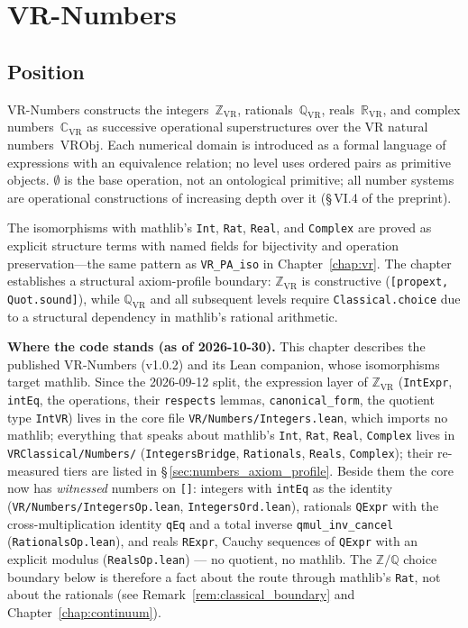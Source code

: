 \chapter{VR-Numbers}
\label{chap:numbers}

\section{Position}

VR-Numbers constructs the integers~$\mathbb{Z}_{\mathrm{VR}}$, rationals~$\mathbb{Q}_{\mathrm{VR}}$,
reals~$\mathbb{R}_{\mathrm{VR}}$, and complex numbers~$\mathbb{C}_{\mathrm{VR}}$ as successive
operational superstructures over the VR natural numbers~$\mathrm{VRObj}$.
Each numerical domain is introduced as a formal language of expressions with an equivalence
relation; no level uses ordered pairs as primitive objects.
$\emptyset$ is the base operation, not an ontological primitive; all number systems are
operational constructions of increasing depth over it (§\,VI.4 of the preprint).

The isomorphisms with mathlib's \texttt{Int}, \texttt{Rat}, \texttt{Real}, and
\texttt{Complex} are proved as explicit structure terms with named fields for
bijectivity and operation preservation---the same pattern as \texttt{VR\_PA\_iso}
in Chapter~\ref{chap:vr}.  The chapter establishes a structural axiom-profile
boundary: $\mathbb{Z}_{\mathrm{VR}}$ is constructive (\texttt{[propext, Quot.sound]}),
while $\mathbb{Q}_{\mathrm{VR}}$ and all subsequent levels require
\texttt{Classical.choice} due to a structural dependency in mathlib's rational
arithmetic.

\textbf{Where the code stands (as of 2026-10-30).}  This chapter describes the
published VR-Numbers (v1.0.2) and its Lean companion, whose isomorphisms target
mathlib.  Since the 2026-09-12 split, the expression layer of $\mathbb{Z}_{\mathrm{VR}}$
(\texttt{IntExpr}, \texttt{intEq}, the operations, their \texttt{respects} lemmas,
\texttt{canonical\_form}, the quotient type \texttt{IntVR}) lives in the core file
\texttt{VR/Numbers/Integers.lean}, which imports no mathlib; everything that speaks about
mathlib's \texttt{Int}, \texttt{Rat}, \texttt{Real}, \texttt{Complex} lives in
\texttt{VRClassical/Numbers/} (\texttt{IntegersBridge}, \texttt{Rationals},
\texttt{Reals}, \texttt{Complex}); their re-measured tiers are listed in
\S\,\ref{sec:numbers_axiom_profile}.  Beside
them the core now has \emph{witnessed} numbers on \texttt{[]}: integers with
\texttt{intEq} as the identity (\texttt{VR/Numbers/IntegersOp.lean},
\texttt{IntegersOrd.lean}), rationals \texttt{QExpr} with the cross-multiplication
identity \texttt{qEq} and a total inverse \texttt{qmul\_inv\_cancel}
(\texttt{RationalsOp.lean}), and reals \texttt{RExpr}, Cauchy sequences of
\texttt{QExpr} with an explicit modulus (\texttt{RealsOp.lean}) --- no quotient, no
mathlib.  The $\mathbb{Z}/\mathbb{Q}$ choice boundary below is therefore a fact about the
route through mathlib's \texttt{Rat}, not about the rationals (see
Remark~\ref{rem:classical_boundary} and Chapter~\ref{chap:continuum}).

